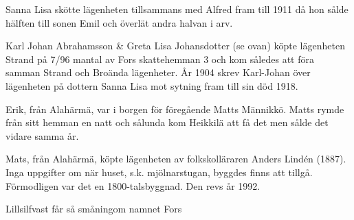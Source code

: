Sanna Lisa skötte lägenheten tillsammans med Alfred fram till 1911 	då hon sålde hälften till sonen Emil och överlät andra halvan i arv.



Karl Johan Abrahamsson \& Greta Lisa Johansdotter (se ovan) köpte lägenheten Strand på 7/96 mantal av Fors skattehemman 3 och kom således att föra samman Strand och Broända lägenheter. År 1904 skrev Karl-Johan över lägenheten på dottern Sanna Lisa mot sytning fram till sin död 1918.



Erik, från Alahärmä, var i borgen för föregående Matts Männikkö. Matts rymde från sitt hemman en natt och sålunda kom Heikkilä att få det men sålde det vidare samma år.



Mats, från Alahärmä, köpte lägenheten av folkskolläraren Anders Lindén (1887). Inga uppgifter om när huset, s.k. mjölnarstugan, byggdes finns att tillgå. Förmodligen var det en 1800-talsbyggnad. Den revs år 1992.








 Lillsilfvast får så småningom namnet Fors
